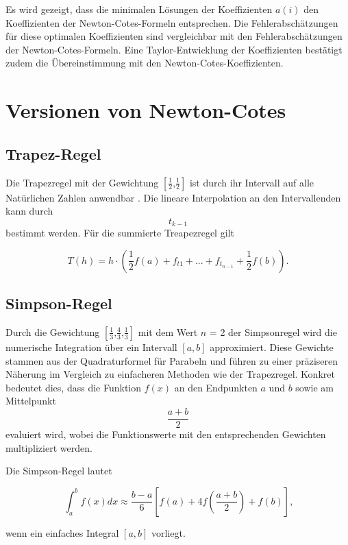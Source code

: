 Es wird gezeigt, dass die minimalen Lösungen der Koeffizienten $a(i)$ den Koeffizienten der Newton-Cotes-Formeln entsprechen. Die Fehlerabschätzungen für diese optimalen Koeffizienten sind vergleichbar mit den Fehlerabschätzungen der Newton-Cotes-Formeln. Eine Taylor-Entwicklung der Koeffizienten bestätigt zudem die Übereinstimmung mit den Newton-Cotes-Koeffizienten.

\section{Versionen von Newton-Cotes}

\subsection{Trapez-Regel}
\label{sec:Trapez}
Die Trapezregel mit der Gewichtung \( [\frac{1}{2} \text{,} \frac{1}{2}] \) \textsc{\cite[S. 342] {Gewichte}} ist durch ihr Intervall auf alle Natürlichen Zahlen anwendbar \textsc{\cite[S. 6] {Trapezregel}}. Die lineare Interpolation an den Intervallenden kann durch
\[  t_{k-1}\] 
bestimmt werden. 
Für die summierte Treapezregel gilt

\[ T(h)=h\cdot(\frac{1}{2} f(a)+f_{t1}+...+f_{t_{n-1}}+\frac{1}{2} f(b)) \text{.}\]

\subsection{Simpson-Regel}
\label{sec:Simpson}
Durch die Gewichtung
\([ \frac{1}{3} \text{,} \frac{4}{3} \text{,}  \frac{1}{3} ]\) mit dem Wert \(n\) = 2
der Simpsonregel wird die numerische Integration über ein Intervall $[a,b]$ approximiert\textsc{\cite[S. 342] {Gewichte}}. Diese Gewichte stammen aus der Quadraturformel für Parabeln und führen zu einer präziseren Näherung im Vergleich zu einfacheren Methoden wie der Trapezregel. Konkret bedeutet dies, dass die Funktion $f(x)$ an den Endpunkten $a$ und $b$ sowie am Mittelpunkt \[{\frac{a + b}{2}} \] evaluiert wird, wobei die Funktionswerte mit den entsprechenden Gewichten multipliziert werden.

Die Simpson-Regel lautet

\begin{equation}
    \label{eq:SimpsonRegel}
    \int_a^b f(x) dx \approx \frac{b - a}{6} [f(a)+4f(\frac{a + b}{2})+f(b)] \text{,}\tag{Simpson Regel}
\end{equation}

wenn ein einfaches Integral \([a, b]\) vorliegt\textsc{\cite[S. 17] {Simpsonregel/Milneregel}}.

